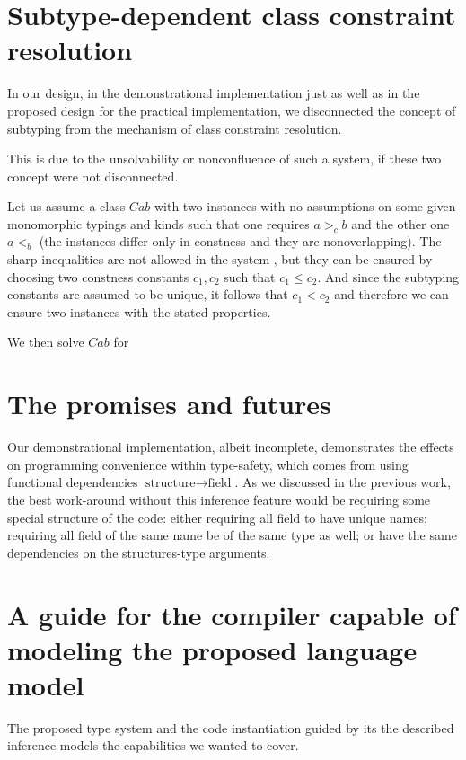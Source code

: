 \section{Subtype-dependent class constraint resolution}

In our design, in the demonstrational implementation just as well as in the proposed design for the practical implementation, we disconnected the concept of subtyping from the mechanism of class constraint resolution.

This is due to the unsolvability or nonconfluence of such a system, if these two concept were not disconnected.

\begin{ex}
    Let us assume a class $C a b$ with two instances with no assumptions on some given monomorphic typings and kinds such that one requires $a >_c b$ and the other one $a <_ b$ (the instances differ only in constness and they are nonoverlapping). The sharp inequalities are not allowed in the system , but they can be ensured by choosing two constness constants $c_1, c_2$ such that $c_1 \leq c_2$. And since the subtyping constants are assumed to be unique, it follows that $c_1 < c_2$ and therefore we can ensure two instances with the stated properties.

    We then solve $C a b$ for
\end{ex}

\section{The promises and futures}
Our demonstrational implementation, albeit incomplete, demonstrates the effects on programming convenience within type-safety, which comes from using functional dependencies $\text{structure} \to \text{field}$. As we discussed in the previous work, the best work-around without this inference feature would be requiring some special structure of the code: either requiring all field to have unique names; requiring all field of the same name be of the same type as well; or have the same dependencies on the structures-type arguments.


\section{A guide for the compiler capable of modeling the proposed language model}

The proposed type system and the code instantiation guided by its the described inference models the capabilities we wanted to cover.

